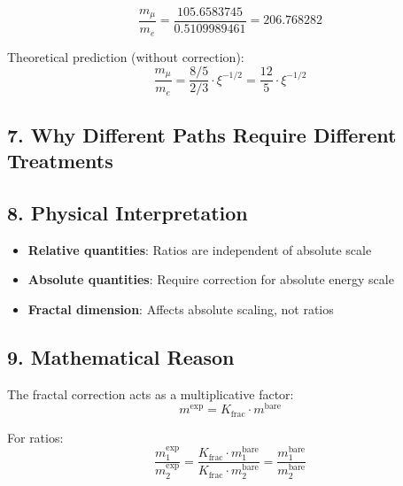 	\[
	\frac{m_\mu}{m_e} = \frac{105.6583745}{0.5109989461} = 206.768282
	\]
	
	Theoretical prediction (without correction):
	\[
	\frac{m_\mu}{m_e} = \frac{8/5}{2/3} \cdot \xi^{-1/2} = \frac{12}{5} \cdot \xi^{-1/2}
	\]
	
	\subsection*{7. Why Different Paths Require Different Treatments}
	
	
	\subsection*{8. Physical Interpretation}
	
	\begin{itemize}
		\item \textbf{Relative quantities}: Ratios are independent of absolute scale
		\item \textbf{Absolute quantities}: Require correction for absolute energy scale
		\item \textbf{Fractal dimension}: Affects absolute scaling, not ratios
	\end{itemize}
	
	\subsection*{9. Mathematical Reason}
	
	The fractal correction acts as a multiplicative factor:
	\[
	m^{\text{exp}} = K_{\text{frac}} \cdot m^{\text{bare}}
	\]
	
	For ratios:
	\[
	\frac{m_1^{\text{exp}}}{m_2^{\text{exp}}} = \frac{K_{\text{frac}} \cdot m_1^{\text{bare}}}{K_{\text{frac}} \cdot m_2^{\text{bare}}} = \frac{m_1^{\text{bare}}}{m_2^{\text{bare}}}
	\]
	
